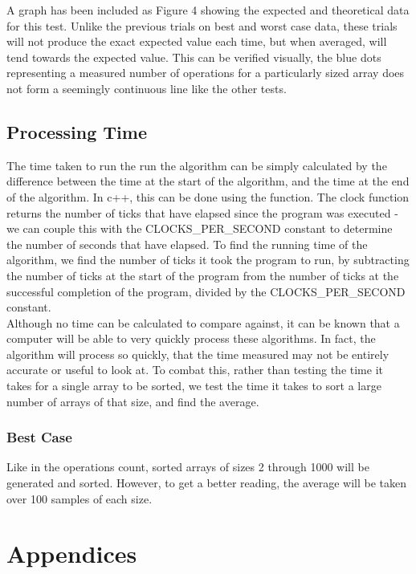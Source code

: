 \documentclass{article}
\begin{document}
            A graph has been included as Figure 4 showing the expected and theoretical data for this test. Unlike the previous trials on best and worst case data, these trials will not produce the exact expected value each time, but when averaged, will tend towards the expected value. This can be verified visually, the blue dots representing a measured number of operations for a particularly sized array does not form a seemingly continuous line like the other tests.

    \subsection{Processing Time}
        The time taken to run the run the algorithm can be simply calculated by the difference between the time at the start of the algorithm, and the time at the end of the algorithm. In c++, this can be done using the  function. The clock function returns the number of ticks that have elapsed since the program was executed - we can couple this with the CLOCKS_PER_SECOND constant to determine the number of seconds that have elapsed. To find the running time of the algorithm, we find the number of ticks it took the program to run, by subtracting the number of ticks at the start of the program from the number of ticks at the successful completion of the program, divided by the CLOCKS_PER_SECOND constant.\\

        Although no time can be calculated to compare against, it can be known that a computer will be able to very quickly process these algorithms. In fact, the algorithm will process so quickly, that the time measured may not be entirely accurate or useful to look at. To combat this, rather than testing the time it takes for a single array to be sorted, we test the time it takes to sort a large number of arrays of that size, and find the average.

        \subsubsection{Best Case}
            Like in the operations count, sorted arrays of sizes 2 through 1000 will be generated and sorted. However, to get a better reading, the average will be taken over 100 samples of each size.

\section{Appendices}
\end{document}
